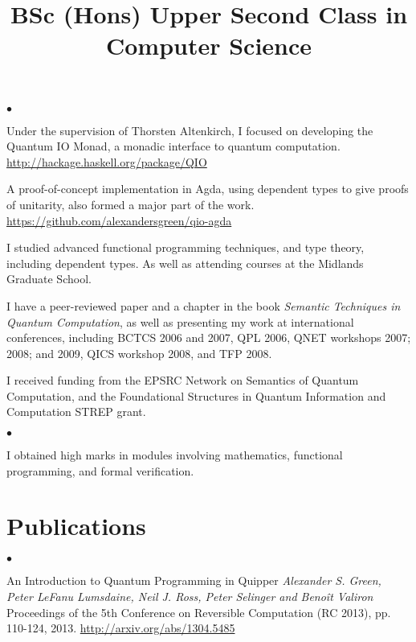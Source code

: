\documentclass[line]{res}
\newenvironment{list2}{
  \begin{list}{$\bullet$}{%
      \setlength{\itemsep}{0in}
      \setlength{\parsep}{0.045in} \setlength{\parskip}{0in}
      \setlength{\topsep}{0in} \setlength{\partopsep}{0in}
      \setlength{\leftmargin}{0.2in}}}{\end{list}}
\begin{document}
\begin{resume}
\begin{position}
\begin{list2}
\item Under the supervision of Thorsten Altenkirch, I
  focused on developing the Quantum IO Monad, a monadic interface to
  quantum computation. \url{http://hackage.haskell.org/package/QIO}
\item A proof-of-concept implementation in Agda, using dependent types
  to give proofs of unitarity, also formed a major part of the
  work. \url{https://github.com/alexandersgreen/qio-agda}
\item I studied advanced functional programming techniques, and
  type theory, including dependent types. As well as attending courses
  at the Midlands Graduate School.
\item I have a peer-reviewed paper and a chapter in
  the book \emph{Semantic Techniques in Quantum Computation}, as well
  as presenting my work at international conferences, including 
  BCTCS 2006 and 2007, QPL 2006, QNET workshops 2007; 2008; and 2009,
  QICS workshop 2008, and TFP 2008.
\item I received funding from the EPSRC Network on Semantics of
  Quantum Computation, and the Foundational Structures in Quantum
  Information and Computation STREP grant. 
\end{list2}
\end{position}

\vspace{-2mm}
 \location{}
\title{\bf{BSc (Hons) Upper Second Class in Computer Science}}
\begin{position}
\vspace{-4mm}
\begin{list2}
\item I obtained high marks in modules involving mathematics,
  functional programming, and formal verification. 
\end{list2}
\end{position}

\vspace{-4mm}
\section{\sc Publications}
\begin{list2}
\item An Introduction to Quantum Programming in Quipper
\emph{Alexander S. Green, Peter LeFanu Lumsdaine, Neil J. Ross, 
 Peter Selinger and Beno\^{i}t Valiron}
Proceedings of the 5th Conference on Reversible Computation (RC 2013),
pp. 110-124, 2013. \url{http://arxiv.org/abs/1304.5485}


\end{list2}
\end{resume}
\end{document}
